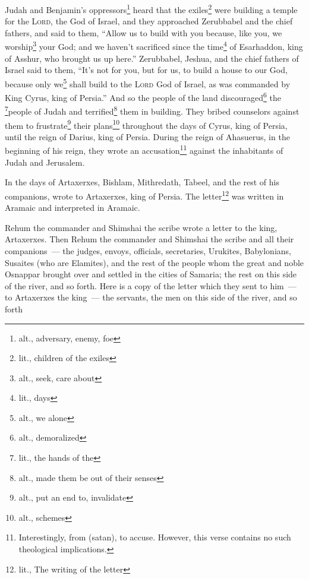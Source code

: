 
\begin{inparaenum}
     Judah and Benjamin's oppressors\footnote{alt., adversary, enemy, foe} heard that the exiles\footnote{lit., children of the exiles} were building a temple for the \textsc{Lord}, the God of Israel,%
     and they approached Zerubbabel and the chief fathers, and said to them, ``Allow us to build with you because, like you, we worship\footnote{alt., seek, care about} your God; and we haven't sacrificed since the time\footnote{lit., days} of Esarhaddon, king of Asshur, who brought us up here.''%
     Zerubbabel, Jeshua, and the chief fathers of Israel said to them, ``It's not for you, but for us, to build a house to our God, because only we\footnote{alt., we alone} shall build to the \textsc{Lord} God of Israel, as was commanded by King Cyrus, king of Persia.''%
     And so the people of the land discouraged\footnote{alt., demoralized} the \footnote{lit., the hands of the}people of Judah and terrified\footnote{alt., made them be out of their senses} them in building.%
     They bribed counselors against them to frustrate\footnote{alt., put an end to, invalidate} their plans\footnote{alt., schemes} throughout the days of Cyrus, king of Persia, until the reign of Darius, king of Persia.%
     During the reign of Ahasuerus, in the beginning of his reign, they wrote an accusation\footnote{Interestingly, from  (satan), to accuse. However, this verse contains no such theological implications.} against the inhabitants of Judah and Jerusalem.%
    
     In the days of Artaxerxes, Bishlam, Mithredath, Tabeel, and the rest of his companions, wrote to Artaxerxes, king of Persia. The letter\footnote{lit., The writing of the letter} was written in Aramaic and interpreted in Aramaic.%
    
     Rehum the commander and Shimshai the scribe wrote a letter to the king, Artaxerxes.%
     Then Rehum the commander and Shimshai the scribe and all their companions~--- the judges, envoys, officials, secretaries, Urukites, Babylonians, Susaites (who are Elamites),%
     and the rest of the people whom the great and noble Osnappar brought over and settled in the cities of Samaria; the rest on this side of the river, and so forth.%
     Here is a copy of the letter which they sent to him~--- to Artaxerxes the king~--- the servants, the men on this side of the river, and so forth%
    

\end{inparaenum}
